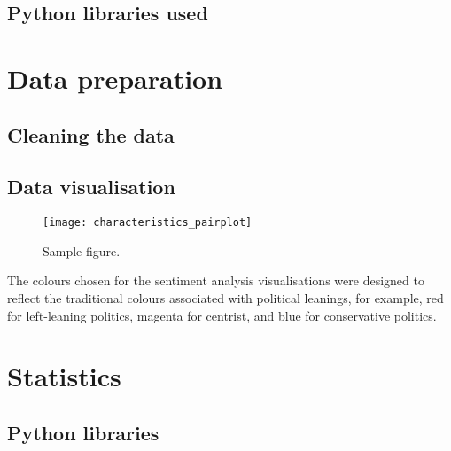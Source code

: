\documentclass[hidelinks,12pt,oneside]{report} %
\begin{document}
\subsection{Python libraries used}


\section{Data preparation}
\subsection{Cleaning the data}


\subsection{Data visualisation}

\begin{figure}[!ht]
	\centering
	\vspace{.4218cm}
		\texttt{[image: characteristics\_pairplot]}	\captionsetup{justification=justified,width=1\linewidth}
	\caption{Sample figure.}
\label{fig:characteristics_pairplot}
\end{figure}

The colours chosen for the sentiment analysis visualisations were designed to reflect the traditional colours associated with political leanings, for example, red for left-leaning politics, magenta for centrist, and blue for conservative politics.

\section{Statistics}
\subsection{Python libraries}
\end{document}
